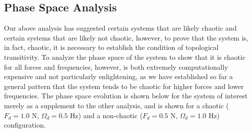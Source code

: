 \documentclass[11pt]{article} %
\begin{document}
    \subsection{Phase Space Analysis}
    Our above analysis has suggested certain systems that are likely chaotic and certain systems that are likely not chaotic, however, to prove that
    the system is, in fact, chaotic, it is necessary to establish the condition of topological transitivity. To analyze the phase space of the system 
    to show that it is chaotic for all forces and frequencies, however, is both extremely computationally expensive and not particularly enlightening, 
    as we have established so far a general pattern that the system tends to be chaotic for higher forces and lower frequencies. The phase space evolution 
    is shown below for the system of interest merely as a supplement to the other analysis, and is shown for a chaotic ($F_d=1.0$ N, $\Omega_d=0.5$ Hz) and
    a non-chaotic ($F_d=0.5$ N, $\Omega_d=1.0$ Hz) configuration.
\end{document}
